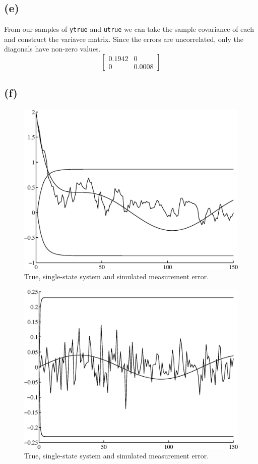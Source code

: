 \documentclass[fleqn, letterpaper]{tufte-handout}
\begin{document}
\subsection{(e)}
From our samples of \texttt{ytrue} and \texttt{utrue} we can take the sample covariance of each and construct the variavce matrix. Since the errors are uncorrelated, only the diagonals have non-zero values.
\[
\begin{bmatrix} 0.1942 & 0 \\ 0 & 0.0008
\end{bmatrix}
\]
\subsection{(f)}
\begin{figure}
        \includegraphics[width=\textwidth]{2fa}
        \caption{True, single-state system and simulated measurement error.}
        \label{2fa}
\end{figure}
\begin{figure}
        \includegraphics[width=\textwidth]{2fb}
        \caption{True, single-state system and simulated measurement error.}
        \label{2fb}
\end{figure}
\end{document}
